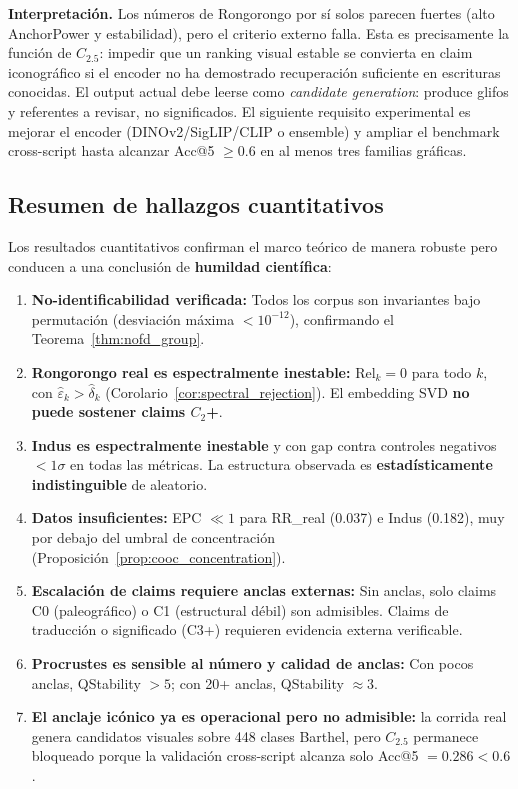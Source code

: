 \documentclass[11pt,a4paper]{article}
\newcommand{\1}{\mathbf{1}}
\numberwithin{equation}{section}
\begin{document}
\textbf{Interpretación.} Los números de Rongorongo por sí solos parecen fuertes (alto AnchorPower y estabilidad), pero el criterio externo falla. Esta es precisamente la función de $C_{2.5}$: impedir que un ranking visual estable se convierta en claim iconográfico si el encoder no ha demostrado recuperación suficiente en escrituras conocidas. El output actual debe leerse como \emph{candidate generation}: produce glifos y referentes a revisar, no significados. El siguiente requisito experimental es mejorar el encoder (DINOv2/SigLIP/CLIP o ensemble) y ampliar el benchmark cross-script hasta alcanzar Acc@5 $\geq0.6$ en al menos tres familias gráficas.

\subsection{Resumen de hallazgos cuantitativos}

Los resultados cuantitativos confirman el marco teórico de manera robuste pero conducen a una conclusión de \textbf{humildad científica}:

\begin{enumerate}[label=(\roman*)]
    \item \textbf{No-identificabilidad verificada:} Todos los corpus son invariantes bajo permutación (desviación máxima $< 10^{-12}$), confirmando el Teorema~\ref{thm:nofd_group}.
    \item \textbf{Rongorongo real es espectralmente inestable:} $\mathrm{Rel}_k = 0$ para todo $k$, con $\widehat\varepsilon_k > \widehat\delta_k$ (Corolario~\ref{cor:spectral_rejection}). El embedding SVD \textbf{no puede sostener claims $C_2$+}.
    \item \textbf{Indus es espectralmente inestable} y con gap contra controles negativos $< 1\sigma$ en todas las métricas. La estructura observada es \textbf{estadísticamente indistinguible} de aleatorio.
    \item \textbf{Datos insuficientes:} EPC $\ll 1$ para RR\_real (0.037) e Indus (0.182), muy por debajo del umbral de concentración (Proposición~\ref{prop:cooc_concentration}).
    \item \textbf{Escalación de claims requiere anclas externas:} Sin anclas, solo claims C0 (paleográfico) o C1 (estructural débil) son admisibles. Claims de traducción o significado (C3+) requieren evidencia externa verificable.
    \item \textbf{Procrustes es sensible al número y calidad de anclas:} Con pocos anclas, QStability $> 5$; con 20+ anclas, QStability $\approx 3$.
    \item \textbf{El anclaje icónico ya es operacional pero no admisible:} la corrida real genera candidatos visuales sobre 448 clases Barthel, pero $C_{2.5}$ permanece bloqueado porque la validación cross-script alcanza solo Acc@5 $=0.286 < 0.6$.
\end{enumerate}
\end{document}
